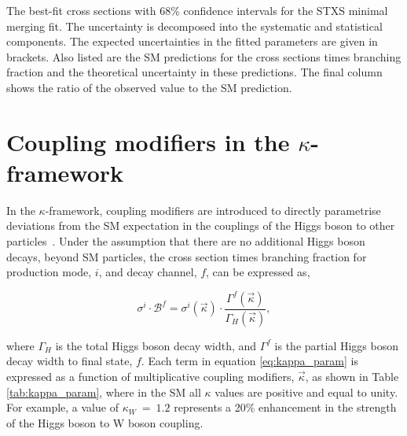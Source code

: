 \begin{table}[htb!]
  \centering
  \scriptsize
  \renewcommand{\arraystretch}{1.8}
  \setlength{\tabcolsep}{2.2pt}
  \caption[Results of the STXS stage 1.2 minimal merging fit]
  {
    The best-fit cross sections with 68\% confidence intervals for the STXS minimal merging fit. The uncertainty is decomposed into the systematic and statistical components. The expected uncertainties in the fitted parameters are given in brackets. Also listed are the SM predictions for the cross sections times branching fraction and the theoretical uncertainty in these predictions. The final column shows the ratio of the observed value to the SM prediction.
  }
  \label{tab:stage1p2_minimal_results}
  \hspace*{-.5cm}
  
  \hspace*{-.5cm}
\end{table}

\FloatBarrier
\newpage
\section{Coupling modifiers in the $\kappa$-framework}\label{sec:results_kappa}
In the $\kappa$-framework, coupling modifiers are introduced to directly parametrise deviations from the SM expectation in the couplings of the Higgs boson to other particles~\cite{Heinemeyer:2013tqa}. Under the assumption that there are no additional Higgs boson decays, beyond SM particles, the cross section times branching fraction for production mode, $i$, and decay channel, $f$, can be expressed as,

\begin{equation}\label{eq:kappa_param}
    \sigma^i \cdot \mathcal{B}^f = \sigma^i(\vec{\kappa}) \cdot \frac{\Gamma^f(\vec{\kappa})}{\Gamma_H(\vec{\kappa})},
\end{equation}

\noindent
where $\Gamma_H$ is the total Higgs boson decay width, and $\Gamma^f$ is the partial Higgs boson decay width to final state, $f$. Each term in equation \ref{eq:kappa_param} is expressed as a function of multiplicative coupling modifiers, $\vec{\kappa}$, as shown in Table \ref{tab:kappa_param}, where in the SM all $\kappa$ values are positive and equal to unity. For example, a value of $\kappa_W~=~1.2$ represents a 20\% enhancement in the strength of the Higgs boson to W boson coupling.

